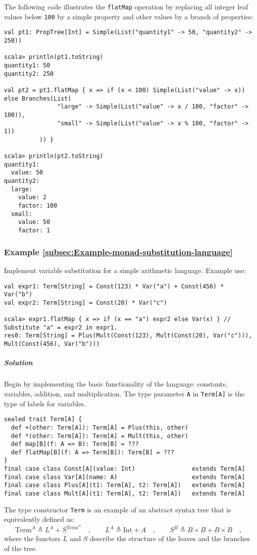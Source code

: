 The following code illustrates the \lstinline!flatMap! operation
by replacing all integer leaf values below \lstinline!100! by a simple
property and other values by a branch of properties:
\begin{lstlisting}
val pt1: PropTree[Int] = Simple(List("quantity1" -> 50, "quantity2" -> 250))

scala> println(pt1.toString)
quantity1: 50
quantity2: 250

val pt2 = pt1.flatMap { x => if (x < 100) Simple(List("value" -> x)) else Branches(List(
               "large" -> Simple(List("value" -> x / 100, "factor" -> 100)),
               "small" -> Simple(List("value" -> x % 100, "factor" -> 1))
          )) }

scala> println(pt2.toString)
quantity1:
  value: 50
quantity2:
  large:
    value: 2
    factor: 100
  small:
    value: 50
    factor: 1
\end{lstlisting}


\subsubsection{Example \label{subsec:Example-monad-substitution-language}\ref{subsec:Example-monad-substitution-language}}

Implement variable substitution for a simple arithmetic language.
Example use:
\begin{lstlisting}
val expr1: Term[String] = Const(123) * Var("a") + Const(456) * Var("b")
val expr2: Term[String] = Const(20) * Var("c")

scala> expr1.flatMap { x => if (x == "a") expr2 else Var(x) } // Substitute "a" = expr2 in expr1.
res0: Term[String] = Plus(Mult(Const(123), Mult(Const(20), Var("c"))), Mult(Const(456), Var("b"))) 
\end{lstlisting}


\subparagraph{Solution}

Begin by implementing the basic functionality of the language: constants,
variables, addition, and multiplication. The type parameter \lstinline!A!
in \lstinline!Term[A]! is the type of labels for variables. 
\begin{lstlisting}
sealed trait Term[A] {
  def +(other: Term[A]): Term[A] = Plus(this, other)
  def *(other: Term[A]): Term[A] = Mult(this, other)
  def map[B](f: A => B): Term[B] = ???
  def flatMap[B](f: A => Term[B]): Term[B] = ???
}
final case class Const[A](value: Int)                extends Term[A]
final case class Var[A](name: A)                     extends Term[A]
final case class Plus[A](t1: Term[A], t2: Term[A])   extends Term[A]
final case class Mult[A](t1: Term[A], t2: Term[A])   extends Term[A]
\end{lstlisting}
The type constructor \lstinline!Term! is an example of an abstract
syntax tree that is equivalently defined
as:
\[
\text{Term}^{A}\triangleq L^{A}+S^{\text{Term}^{A}}\quad,\quad\quad L^{A}\triangleq\text{Int}+A\quad,\quad\quad S^{B}\triangleq B\times B+B\times B\quad,
\]
where the functors $L$ and $S$ describe the structure of the leaves
and the branches of the tree.

